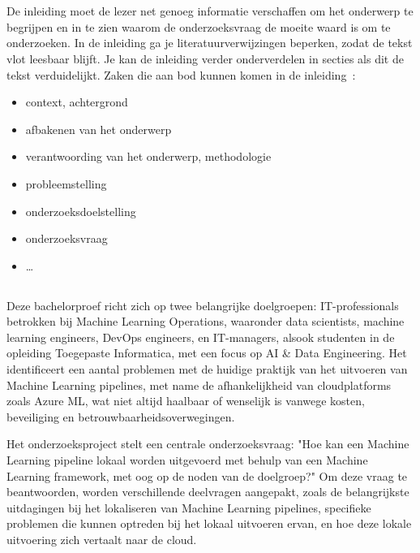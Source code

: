 
\chapter{}%
\label{ch:inleiding}

De inleiding moet de lezer net genoeg informatie verschaffen om het onderwerp te begrijpen en in te zien waarom de onderzoeksvraag de moeite waard is om te onderzoeken. In de inleiding ga je literatuurverwijzingen beperken, zodat de tekst vlot leesbaar blijft. Je kan de inleiding verder onderverdelen in secties als dit de tekst verduidelijkt. Zaken die aan bod kunnen komen in de inleiding~\autocite{Pollefliet2011}:

\begin{itemize}
  \item context, achtergrond
  \item afbakenen van het onderwerp
  \item verantwoording van het onderwerp, methodologie
  \item probleemstelling
  \item onderzoeksdoelstelling
  \item onderzoeksvraag
  \item \ldots
\end{itemize}

\section{}%
\label{sec:probleemstelling}

Deze bachelorproef richt zich op twee belangrijke doelgroepen: IT-professionals betrokken bij Machine Learning Operations, waaronder data scientists, machine learning engineers, DevOps engineers, en IT-managers, alsook studenten in de opleiding Toegepaste Informatica, met een focus op AI & Data Engineering. Het identificeert een aantal problemen met de huidige praktijk van het uitvoeren van Machine Learning pipelines, met name de afhankelijkheid van cloudplatforms zoals Azure ML, wat niet altijd haalbaar of wenselijk is vanwege kosten, beveiliging en betrouwbaarheidsoverwegingen.

Het onderzoeksproject stelt een centrale onderzoeksvraag: "Hoe kan een Machine Learning pipeline lokaal worden uitgevoerd met behulp van een Machine Learning framework, met oog op de noden van de doelgroep?" Om deze vraag te beantwoorden, worden verschillende deelvragen aangepakt, zoals de belangrijkste uitdagingen bij het lokaliseren van Machine Learning pipelines, specifieke problemen die kunnen optreden bij het lokaal uitvoeren ervan, en hoe deze lokale uitvoering zich vertaalt naar de cloud.

